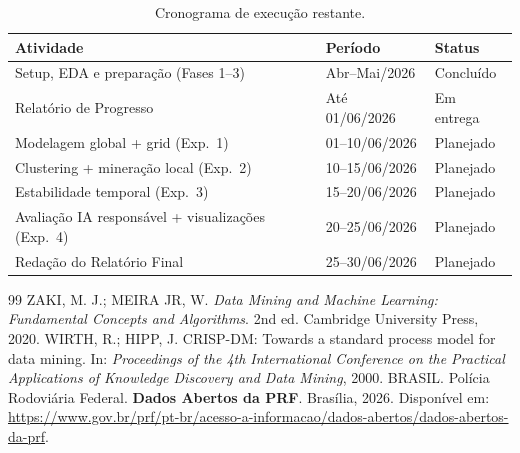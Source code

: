 \documentclass[12pt]{article}
\begin{document}
\begin{table}[H]
    \centering
    \caption{Cronograma de execução restante.}
    \label{tab:cronograma}
    \begin{tabular}{lll}
        \toprule
        \textbf{Atividade} & \textbf{Período} & \textbf{Status} \\
        \midrule
        Setup, EDA e preparação (Fases 1--3) & Abr--Mai/2026 & Concluído \\
        Relatório de Progresso & Até 01/06/2026 & Em entrega \\
        Modelagem global + grid (Exp.~1) & 01--10/06/2026 & Planejado \\
        Clustering + mineração local (Exp.~2) & 10--15/06/2026 & Planejado \\
        Estabilidade temporal (Exp.~3) & 15--20/06/2026 & Planejado \\
        Avaliação IA responsável + visualizações (Exp.~4) & 20--25/06/2026 & Planejado \\
        Redação do Relatório Final & 25--30/06/2026 & Planejado \\
        \bottomrule
    \end{tabular}
\end{table}

\begin{thebibliography}{99}
     ZAKI, M. J.; MEIRA JR, W. \textit{Data Mining and Machine Learning: Fundamental Concepts and Algorithms}. 2nd ed. Cambridge University Press, 2020.
     WIRTH, R.; HIPP, J. CRISP-DM: Towards a standard process model for data mining. In: \textit{Proceedings of the 4th International Conference on the Practical Applications of Knowledge Discovery and Data Mining}, 2000.
     BRASIL. Polícia Rodoviária Federal. \textbf{Dados Abertos da PRF}. Brasília, 2026. Disponível em: \url{https://www.gov.br/prf/pt-br/acesso-a-informacao/dados-abertos/dados-abertos-da-prf}.
\end{thebibliography}
\end{document}
